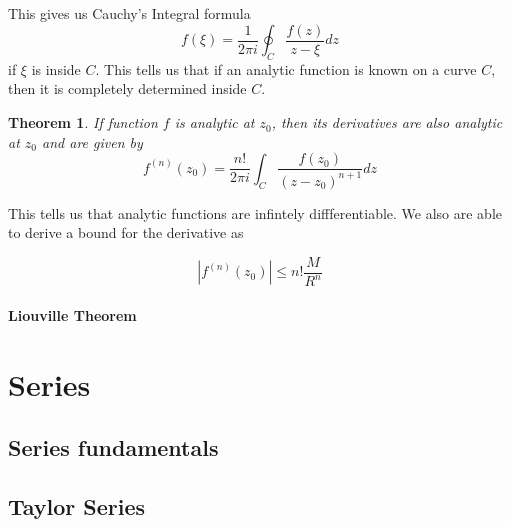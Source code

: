 \documentclass[12pt]{article}
\newcommand{\abs}[1]{ \left| #1 \right| }
\newtheorem{thm}{Theorem}[section]
\theoremstyle{definition}
\theoremstyle{remark}
\numberwithin{equation}{section}
\begin{document}
This gives us Cauchy's Integral formula
\begin{equation}
  f(\xi) = \frac{1}{2\pi i} \oint_C \frac{f(z)}{z-\xi} dz
\end{equation}
if $\xi$ is inside $C$. This tells us that if an analytic function is known on a curve $C$, then it is completely determined inside $C$.


\begin{thm}
If  function $f$ is analytic at $z_0$, then its derivatives are also analytic at $z_0$ and are given by
\begin{equation}
  f^{(n)}(z_0) = \frac{n!}{2\pi i} \int_{C} \frac{f(z_0)}{(z - z_0)^{n+1}}dz
\end{equation}
\end{thm}

This tells us that analytic functions are infintely diffferentiable. We also are able to derive a bound for the derivative as

\begin{equation}
  \abs{ f^{(n)}(z_0) } \leq n!\frac{M}{R^n}
\end{equation}


\paragraph{Liouville Theorem}%
\label{par:liouville_theorem}

\section{Series}%
\label{sec:series}
\subsection{Series fundamentals}%
\label{sub:series_fundamentals}

\subsection{Taylor Series}%
\label{sub:taylor_series}


\end{document}

